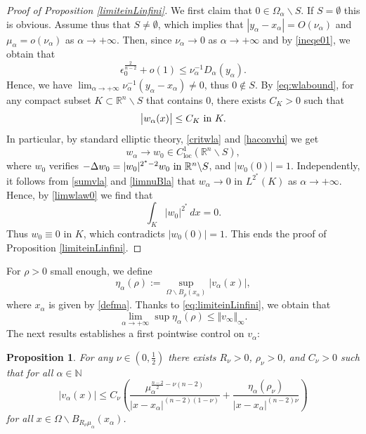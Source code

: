 \documentclass[10pt]{amsart}
\numberwithin{equation}{section}
\newcommand{\Om}{\Omega}
\newcommand{\ma}{\mu_\alpha}
\def \rr {\mathbb{R}}
\def \ep{\epsilon}
\def \bb{\hbox}
\def \vv {\mathbb{\Vert}}
\def \xl{x_\alpha}
\def \ls{+\infty}
\def\la{\alpha}
\def \ma{\mu_{\alpha}}
\def \yl{y_{\alpha}}
\def \va{v_{\alpha}}
\def \vo {v_{\infty}}
\def \nn{\mathbb{N}}
\def \ro{\rho}
\DeclareMathOperator{\loc}{loc}
\theoremstyle{plain}
\newtheorem{prop}{Proposition}[section]%
\theoremstyle{remark}
\begin{document}
\begin{proof}[Proof of Proposition \ref{limiteinLinfini}]

We first claim that $0\in \Om_{\la}\backslash S$. If $S =\emptyset$ this is obvious. Assume thus that $S \neq \emptyset$, which implies that $|\yl-\xl|=O(\nu_\la)$ and  $\ma=o(\nu_{\la})$ as $\alpha \to + \infty$. Then, since $\nu_\la\to 0$ as $\la\to \ls$ and by \eqref{ineqe01}, we obtain that $$\ep_0^{\frac{2}{n-2}} +o(1)\leq \nu_\la^{-1}D_\la(\yl).$$ Hence, we have $\lim_{\la\to \ls} \nu_{\la}^{-1}(\yl-\xl)\neq 0$, thus $0\notin S$.  By \eqref{eq:wlabound}, for any compact subset $K\subset \rr^n\backslash S$ that contains $0$, there exists $C_K>0$ such that $$\big|w_\la(x)\big|\leq C_K \bb{ in } K.$$
 In particular, by standard elliptic theory, \eqref{critwla} and \eqref{haconvhi}  we get
\begin{equation}\label{limwlaw0}
w_{\la}\to w_0\in C^1_{\loc}(\rr^n\backslash S), 
\end{equation}
where $w_0$ verifies $-\Delta w_0= |w_0|^{2^*-2}w_0 \bb{ in } \rr^n\backslash S$, and $\big|w_0(0)\big|=1$. Independently, it follows from \eqref{sumvla} and \eqref{limnuBla} that $w_\la\to 0$ in $L^{2^*}(K)$ as $\la \to \ls$. Hence, by \eqref{limwlaw0} we find that 
\begin{equation*}
\int_K |w_0|^{2^*}\, dx =0.
\end{equation*}
Thus $w_0\equiv 0$ in $K$, which contradicts  $|w_0(0)|=1$. This ends the proof of Proposition \ref{limiteinLinfini}.
\end{proof}
For $\ro>0$ small enough, we define
\begin{equation}\label{etala}
	\eta_{\la}(\ro):=\sup_{\Om\backslash B_{\ro}(\xl)} \big| v_{\la}(x)\big|,
\end{equation} 
where $\xl$ is given by \eqref{defma}. Thanks to \eqref{eq:limiteinLinfini}, we obtain that
\begin{equation}\label{limetaladelta}
	\lim_{\la\to\ls} \sup \eta_{\la}(\ro)\leq \vv \vo\vv_{\infty}.
\end{equation} 
The next results establishes a first pointwise control on $\va$:


\begin{prop}\label{firstestimation}
For any $\nu \in (0,\frac{1}{2})$ there exists $R_{\nu}>0$, $\ro_{\nu}>0$, and $C_{\nu}>0$ such that for all $\alpha\in \nn$
\begin{equation}\label{eq:firstestimation}
\big|v_{\la}(x)\big|\leq C_{\nu}\left( \frac{\ma^{\frac{n-2}{2}-\nu(n-2)}}{|x-\xl|^{(n-2)(1-\nu)}}+\frac{\eta_{\la}(\ro_{\nu})}{|x-\xl|^{(n-2)\nu}}\right) 
\end{equation} 
for all $ x\in \Om \backslash B_{R_{\nu}\ma}(\xl)$.
\end{prop}
\end{document}
